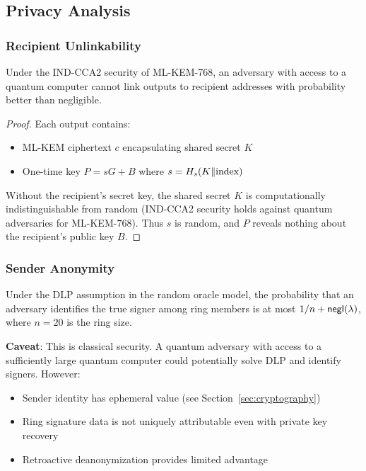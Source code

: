 \subsection{Privacy Analysis}

\subsubsection{Recipient Unlinkability}

\begin{theorem}
Under the IND-CCA2 security of ML-KEM-768, an adversary with access to
a quantum computer cannot link outputs to recipient addresses with
probability better than negligible.
\end{theorem}

\begin{proof}
Each output contains:
\begin{itemize}
  \item ML-KEM ciphertext $c$ encapsulating shared secret $K$
  \item One-time key $P = sG + B$ where $s = H_s(K \| \text{index})$
\end{itemize}

Without the recipient's secret key, the shared secret $K$ is computationally
indistinguishable from random (IND-CCA2 security holds against quantum
adversaries for ML-KEM-768). Thus $s$ is random, and $P$ reveals nothing
about the recipient's public key $B$.
\end{proof}

\subsubsection{Sender Anonymity}

\begin{theorem}
Under the DLP assumption in the random oracle model, the probability that
an adversary identifies the true signer among ring members is at most
$1/n + \mathsf{negl}(\lambda)$, where $n = 20$ is the ring size.
\end{theorem}

\textbf{Caveat}: This is classical security. A quantum adversary with access
to a sufficiently large quantum computer could potentially solve DLP and
identify signers. However:
\begin{itemize}
  \item Sender identity has ephemeral value (see Section~\ref{sec:cryptography})
  \item Ring signature data is not uniquely attributable even with private
    key recovery
  \item Retroactive deanonymization provides limited advantage
\end{itemize}

